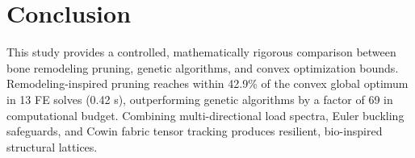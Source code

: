 \documentclass[10pt,journal,compsoc]{IEEEtran}
\begin{document}
\section{Conclusion}
This study provides a controlled, mathematically rigorous comparison between bone remodeling pruning, genetic algorithms, and convex optimization bounds. Remodeling-inspired pruning reaches within 42.9\% of the convex global optimum in 13 FE solves (0.42 s), outperforming genetic algorithms by a factor of 69 in computational budget. Combining multi-directional load spectra, Euler buckling safeguards, and Cowin fabric tensor tracking produces resilient, bio-inspired structural lattices.



\end{document}
